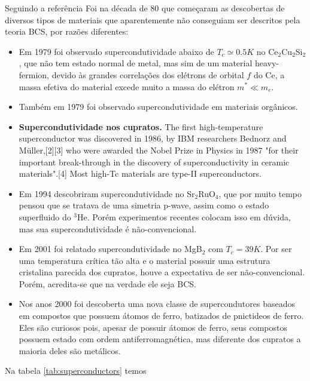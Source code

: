 \documentclass[a4paper,10pt]{article}
\begin{document}
Seguindo a referência \cite{timm}Foi na década de 80 que começaram as descobertas de diversos tipos de materiais que aparentemente não conseguiam ser descritos pela teoria BCS, por razões diferentes:
\begin{itemize}
\item Em 1979 foi observado supercondutividade abaixo de $T_c \simeq 0.5 \unit{K}$ no Ce$_2$Cu$_2$Si$_2$, que não tem estado normal de metal, mas sim de um material heavy-fermion, devido às grandes correlações dos elétrons de orbital $f$ do Ce, a massa efetiva do material excede muito a massa do elétron $m^* \ll m_e$.
\item Também em 1979 foi observado supercondutividade em materiais orgânicos.
\item \textbf{Supercondutividade nos cupratos.} The first high-temperature superconductor was discovered in 1986, by IBM researchers Bednorz and Müller,[2][3] who were awarded the Nobel Prize in Physics in 1987 "for their important break-through in the discovery of superconductivity in ceramic materials".[4] Most high-Tc materials are type-II superconductors.
\item Em 1994 descobriram supercondutividade no Sr$_2$RuO$_4$, que por muito tempo pensou que se tratava de uma simetria p-wave, assim como o estado superfluido do $^3$He. Porém experimentos recentes colocam isso em dúvida, mas sua supercondutividade é não-convencional.
\item Em 2001 foi relatado supercondutividade no MgB$_2$ com $T_c = 39 \unit{K}$. Por ser uma temperatura crítica tão alta e o material possuir uma estrutura cristalina parecida dos cupratos, houve a expectativa de ser não-convencional. Porém, acredita-se que na verdade ele seja BCS.
\item Nos anos 2000 foi descoberta uma nova classe de supercondutores baseados em compostos que possuem átomos de ferro, batizados de pnictideos de ferro. Eles são curiosos pois, apesar de possuir átomos de ferro, seus compostos possuem estado com ordem antiferromagnética, mas diferente dos cupratos a maioria deles são metálicos.
\end{itemize}

Na tabela \ref{tab:superconductors} temos
\end{document}
